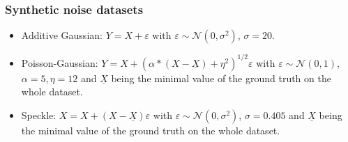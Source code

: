 \documentclass[lettersize,journal]{IEEEtran}
\begin{document}
\subsubsection{Synthetic noise datasets}
\label{si:synthetic}
\begin{itemize}
  \item Additive Gaussian: $Y = X + \varepsilon$ with $\varepsilon \sim \mathcal{N}(0, \sigma^2)$, $\sigma=20$.
  \item Poisson-Gaussian: $Y = X + (\alpha * (X-\underline{X}) + \eta^2 )^{1/2}\varepsilon$  with $\varepsilon \sim \mathcal{N}(0, 1)$, $\alpha=5, \eta=12$ and $\underline{X}$ being the minimal value of the ground truth on the whole dataset.
  \item Speckle: $X = X + (X-\underline{X})\varepsilon$  with $\varepsilon \sim \mathcal{N}(0, \sigma^2)$, $\sigma=0.405$ and $\underline{X}$ being the minimal value of the ground truth on the whole dataset.
\end{itemize}

\end{document}

